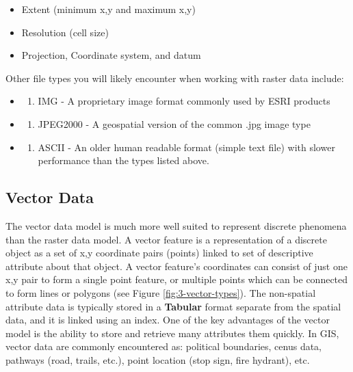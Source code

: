 \documentclass[
]{book}
\providecommand{\tightlist}{%
  \setlength{\itemsep}{0pt}\setlength{\parskip}{0pt}}
\begin{document}
\begin{itemize}
\tightlist
\item
  Extent (minimum x,y and maximum x,y)
\item
  Resolution (cell size)
\item
  Projection, Coordinate system, and datum
\end{itemize}

Other file types you will likely encounter when working with raster data include:

\begin{itemize}
\item
  \begin{enumerate}
  \def\labelenumi{\arabic{enumi})}
  \tightlist
  \item
    IMG - A proprietary image format commonly used by ESRI products
  \end{enumerate}
\item
  \begin{enumerate}
  \def\labelenumi{\arabic{enumi})}
  \setcounter{enumi}{1}
  \tightlist
  \item
    JPEG2000 - A geospatial version of the common .jpg image type
  \end{enumerate}
\item
  \begin{enumerate}
  \def\labelenumi{\arabic{enumi})}
  \setcounter{enumi}{2}
  \tightlist
  \item
    ASCII - An older human readable format (simple text file) with slower performance than the types listed above.
  \end{enumerate}
\end{itemize}

\hypertarget{vector-data}{%
\subsection{Vector Data}\label{vector-data}}

The vector data model is much more well suited to represent discrete phenomena than the raster data model. A vector feature is a representation of a discrete object as a set of x,y coordinate pairs (points) linked to set of descriptive attribute about that object. A vector feature's coordinates can consist of just one x,y pair to form a single point feature, or multiple points which can be connected to form lines or polygons (see Figure \ref{fig:3-vector-types}). The non-spatial attribute data is typically stored in a \textbf{Tabular} format separate from the spatial data, and it is linked using an index. One of the key advantages of the vector model is the ability to store and retrieve many attributes them quickly. In GIS, vector data are commonly encountered as: political boundaries, cenus data, pathways (road, trails, etc.), point location (stop sign, fire hydrant), etc.
\end{document}

